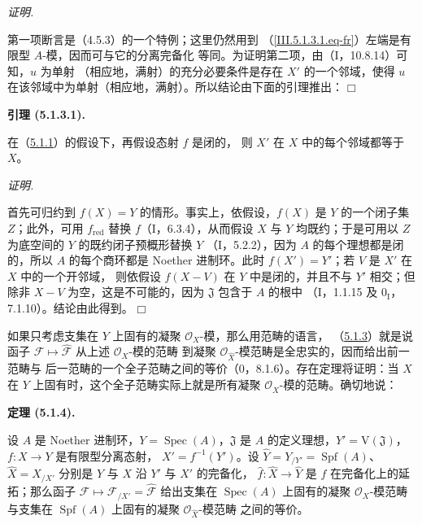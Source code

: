 \documentclass[UTF8,fontset=none,11pt,oneside,openany]{ctexbook}
\providecommand{\square}{\mdlgwhtsquare}
\newenvironment{lemma}[1][]{%
  \par\medskip\noindent\textbf{引理 (#1).}\ %
}{\par}
\newenvironment{theorem}[1][]{%
  \par\medskip\noindent\textbf{定理 (#1).}\ %
}{\par}
\newenvironment{proof}{%
  \par\smallskip\noindent\textit{证明.}\ %
}{\hfill$\square$\par}
\newcommand{\oldpage}[2][]{%
  \hypertarget{ega-source-page-#1-#2}{}%
  \marginnote{\scriptsize\textbf{#1}~|~#2}\ignorespaces}
\let\EGAOriginalLabel\label
\renewcommand{\label}[1]{\phantomsection\EGAOriginalLabel{#1}}
\begin{document}
\begin{proof}
第一项断言是（4.5.3）的一个特例；这里仍然用到
（\ref{III.5.1.3.1.eq-fr}）左端是有限型 $A$-模，因而可与它的分离完备化
等同。为证明第二项，由（I，10.8.14）可知，$\widehat u$ 为单射
（相应地，满射）的充分必要条件是存在 $X'$ 的一个邻域，使得 $u$
在该邻域中为单射（相应地，满射）。所以结论由下面的引理推出：
\end{proof}

\oldpage[III]{150}

\begin{lemma}[5.1.3.1]
\label{III.5.1.3.1-fr}
在（\hyperref[III.5.1.1-fr]{5.1.1}）的假设下，再假设态射 $f$ 是闭的，
则 $X'$ 在 $X$ 中的每个邻域都等于 $X$。
\end{lemma}

\begin{proof}
首先可归约到 $f(X)=Y$ 的情形。事实上，依假设，$f(X)$ 是 $Y$ 的一个闭子集
$Z$；此外，可用 $f_{\mathrm{red}}$ 替换 $f$（I，6.3.4），从而假设 $X$
与 $Y$ 均既约；于是可用以 $Z$ 为底空间的 $Y$ 的既约闭子预概形替换 $Y$
（I，5.2.2），因为 $A$ 的每个理想都是闭的，所以 $A$ 的每个商环都是
Noether 进制环。此时 $f(X')=Y'$；若 $V$ 是 $X'$ 在 $X$ 中的一个开邻域，
则依假设 $f(X-V)$ 在 $Y$ 中是闭的，并且不与 $Y'$ 相交；但除非 $X-V$
为空，这是不可能的，因为 $\mathfrak J$ 包含于 $A$ 的根中
（I，1.1.15 及 $0_{\mathrm I}$，7.1.10）。结论由此得到。
\end{proof}

如果只考虑支集在 $Y$ 上固有的凝聚 $\mathcal O_X$-模，那么用范畴的语言，
（\hyperref[III.5.1.3-fr]{5.1.3}）就是说函子
$\mathcal F\mapsto\widehat{\mathcal F}$ 从上述 $\mathcal O_X$-模的范畴
到凝聚 $\mathcal O_{\widehat X}$-模范畴是全忠实的，因而给出前一范畴与
后一范畴的一个全子范畴之间的等价（$0$，8.1.6）。存在定理将证明：当 $X$
在 $Y$ 上固有时，这个全子范畴实际上就是所有凝聚
$\mathcal O_{\widehat X}$-模的范畴。确切地说：

\begin{theorem}[5.1.4]
\label{III.5.1.4-fr}
设 $A$ 是 Noether 进制环，$Y=\operatorname{Spec}(A)$，$\mathfrak J$ 是
$A$ 的定义理想，$Y'=\mathrm V(\mathfrak J)$，$f:X\to Y$ 是有限型分离态射，
$X'=f^{-1}(Y')$。设 $\widehat Y=Y_{/Y'}=\operatorname{Spf}(A)$、
$\widehat X=X_{/X'}$ 分别是 $Y$ 与 $X$ 沿 $Y'$ 与 $X'$ 的完备化，
$\widehat f:\widehat X\to\widehat Y$ 是 $f$ 在完备化上的延拓；那么函子
$\mathcal F\mapsto\mathcal F_{/X'}=\widehat{\mathcal F}$ 给出支集在
$\operatorname{Spec}(A)$ 上固有的凝聚 $\mathcal O_X$-模范畴与支集在
$\operatorname{Spf}(A)$ 上固有的凝聚 $\mathcal O_{\widehat X}$-模范畴
之间的等价。
\end{theorem}
\end{document}
